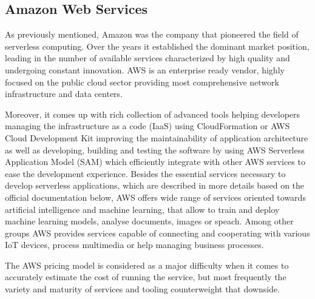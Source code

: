 \subsection{Amazon Web Services}

As previously mentioned, Amazon was the company that pioneered the field of serverless computing. Over the years it established the dominant market position, leading in the number of available services characterized by high quality and undergoing constant innovation. AWS is an enterprise ready vendor, highly focused on the public cloud sector providing most comprehensive network infrastructure and data centers.

Moreover, it comes up with rich collection of advanced tools helping developers managing the infrastructure as a code (IaaS) using CloudFormation or AWS Cloud Development Kit improving the maintainability of application architecture as well as developing, building and testing the software by using AWS Serverless Application Model (SAM) which efficiently integrate with other AWS services to ease the development experience. Besides the essential services necessary to develop serverless applications, which are described in more details based on the official documentation \cite{AWSServerlessOffering} below, AWS offers wide range of services oriented towards artificial intelligence and machine learning, that allow to train and deploy machine learning models, analyse documents, images or speach. Among other groups AWS provides services capable of connecting and cooperating with various IoT devices, process multimedia or help managing business processes.

The AWS pricing model is considered as a major difficulty when it comes to accurately estimate the cost of running the service, but most frequently the variety and maturity of services and tooling counterweight that downside.


